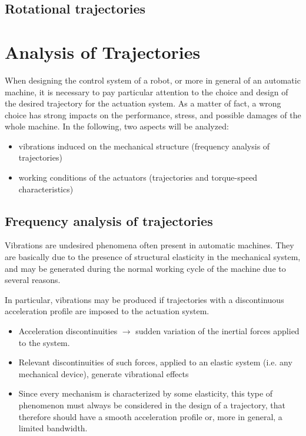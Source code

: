 \documentclass{book}
\begin{document}
\subsection{Rotational trajectories}





\section{Analysis of Trajectories}
When designing the control system of a robot, or more in general of an automatic machine, it is necessary to pay particular attention to the choice and design of the desired trajectory for the actuation system. As a matter of fact, a wrong choice has strong impacts on the performance, stress, and possible damages of the whole machine. In the following, two aspects will be analyzed:\begin{itemize}
    \item vibrations induced on the mechanical structure (frequency analysis of trajectories)
    \item working conditions of the actuators (trajectories and torque-speed characteristics)
\end{itemize}

\subsection{Frequency analysis of trajectories}
Vibrations are undesired phenomena often present in automatic machines. They are basically due to the presence of structural elasticity in the mechanical system, and may be generated during the normal working cycle of the machine due to several reasons. 

In particular, vibrations may be produced if trajectories with a discontinuous acceleration profile are imposed to the actuation system. 
\begin{itemize}
    \item Acceleration discontinuities $\rightarrow$ sudden variation of the inertial forces applied to the system. 
        \item Relevant discontinuities of such forces, applied to an elastic system (i.e. any mechanical device), generate vibrational effects 
            \item Since every mechanism is characterized by some elasticity, this type of phenomenon must always be considered in the design of a trajectory, that therefore should have a smooth acceleration profile or, more in general, a limited bandwidth.
\end{itemize}
\end{document}
